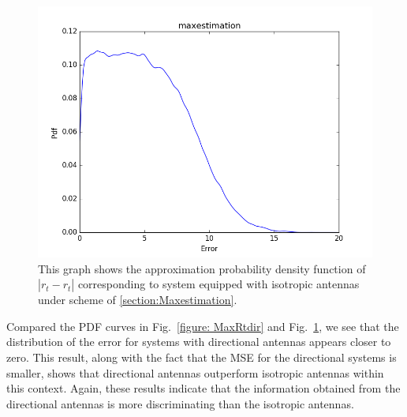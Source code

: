 \begin{figure}[]
	\centering
	\includegraphics[scale=0.5]{Figures/maxrtomni.png}
	\caption{This graph shows the approximation probability density function of $|r_{t}-\hat{r_{t}}|$ corresponding to system equipped with isotropic antennas under scheme of \ref{section:Maxestimation}. }
	\label{figure: MaxRtomni}
\end{figure}
Compared the PDF curves in Fig.~\ref{figure: MaxRtdir} and Fig.~\ref{figure: MaxRtomni}, we see that the distribution of the error for systems with directional antennas appears closer to zero.
This result, along with the fact that the MSE for the directional systems is smaller, shows that directional antennas outperform isotropic antennas within this context.
Again, these results indicate that the information obtained from the directional antennas is more discriminating than the isotropic antennas. 


